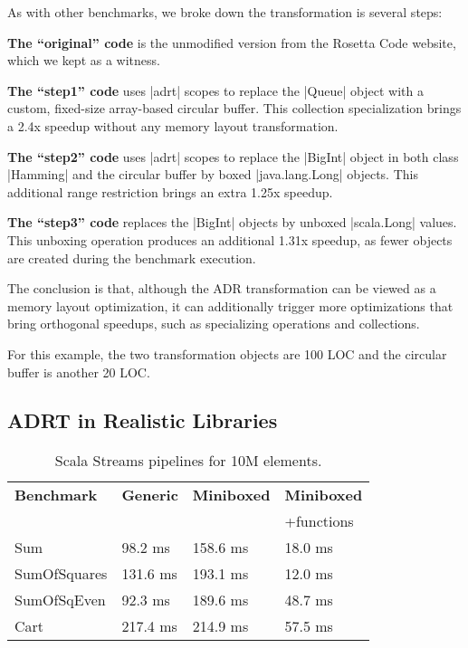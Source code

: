 As with other benchmarks, we broke down the transformation is several steps:


\noindent
\textbf{The ``original'' code} is the unmodified version from the Rosetta Code website, which we kept as a witness.


\noindent
\textbf{The ``step1'' code} uses |adrt| scopes to replace the |Queue| object with a custom, fixed-size array-based circular buffer. This collection specialization brings a 2.4x speedup without any memory layout transformation.


\noindent
\textbf{The ``step2'' code} uses |adrt| scopes to replace the |BigInt| object in both class |Hamming| and the circular buffer by boxed |java.lang.Long| objects. This additional range restriction brings an extra 1.25x speedup.


\noindent
\textbf{The ``step3'' code} replaces the |BigInt| objects by unboxed |scala.Long| values. This unboxing operation produces an additional 1.31x speedup, as fewer objects are created during the benchmark execution.

The conclusion is that, although the ADR transformation can be viewed as a memory layout optimization, it can additionally trigger more optimizations that bring orthogonal speedups, such as
specializing operations and collections.

For this example, the two transformation objects are 100 LOC and the circular buffer is another 20 LOC.

\subsection{ADRT in Realistic Libraries}
\label{sec:benchmarks:funcs}

\begin{table}[t]
  \begin{tabularx}{0.48\textwidth}{|g *{3}{|Y}|} \hline
    \textbf{Benchmark} & \textbf{Generic} & \textbf{Miniboxed}& \textbf{Miniboxed} \\
                       &                  &                   & +functions \\ \hline
    Sum                &          98.2 ms &          158.6 ms &             18.0 ms \\
    SumOfSquares       &         131.6 ms &          193.1 ms &             12.0 ms \\
    SumOfSqEven        &          92.3 ms &          189.6 ms &             48.7 ms \\
    Cart               &         217.4 ms &          214.9 ms &             57.5 ms \\ \hline
  \end{tabularx}

  \caption{Scala Streams pipelines for 10M elements.}
  \label{table:streams}

\end{table}

